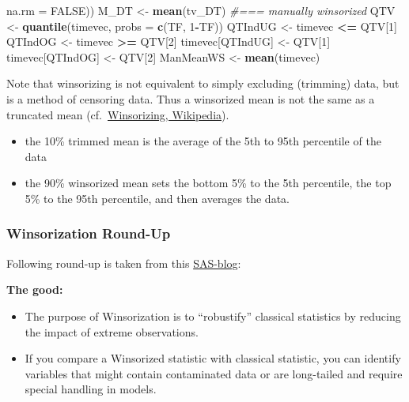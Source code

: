 \documentclass[
]{article}
\newenvironment{Shaded}{\begin{snugshade}}{\end{snugshade}}
\newcommand{\AttributeTok}[1]{\textcolor[rgb]{0.13,0.29,0.53}{#1}}
\newcommand{\CommentTok}[1]{\textcolor[rgb]{0.56,0.35,0.01}{\textit{#1}}}
\newcommand{\ConstantTok}[1]{\textcolor[rgb]{0.56,0.35,0.01}{#1}}
\newcommand{\DecValTok}[1]{\textcolor[rgb]{0.00,0.00,0.81}{#1}}
\newcommand{\FunctionTok}[1]{\textcolor[rgb]{0.13,0.29,0.53}{\textbf{#1}}}
\newcommand{\NormalTok}[1]{#1}
\newcommand{\OtherTok}[1]{\textcolor[rgb]{0.56,0.35,0.01}{#1}}
\newcommand{\SpecialCharTok}[1]{\textcolor[rgb]{0.81,0.36,0.00}{\textbf{#1}}}
\providecommand{\tightlist}{%
  \setlength{\itemsep}{0pt}\setlength{\parskip}{0pt}}
\begin{document}
\begin{Shaded}
\begin{Highlighting}[]
                                    \AttributeTok{na.rm =} \ConstantTok{FALSE}\NormalTok{))}
\NormalTok{  M\_DT      }\OtherTok{\textless{}{-}} \FunctionTok{mean}\NormalTok{(tv\_DT)}
  \CommentTok{\#=== manually winsorized}
\NormalTok{  QTV              }\OtherTok{\textless{}{-}} \FunctionTok{quantile}\NormalTok{(timevec, }\AttributeTok{probs =} \FunctionTok{c}\NormalTok{(TF, }\DecValTok{1}\SpecialCharTok{{-}}\NormalTok{TF))}
\NormalTok{  QTIndUG          }\OtherTok{\textless{}{-}}\NormalTok{ timevec }\SpecialCharTok{\textless{}=}\NormalTok{ QTV[}\DecValTok{1}\NormalTok{]}
\NormalTok{  QTIndOG          }\OtherTok{\textless{}{-}}\NormalTok{ timevec }\SpecialCharTok{\textgreater{}=}\NormalTok{ QTV[}\DecValTok{2}\NormalTok{]}
\NormalTok{  timevec[QTIndUG] }\OtherTok{\textless{}{-}}\NormalTok{ QTV[}\DecValTok{1}\NormalTok{]}
\NormalTok{  timevec[QTIndOG] }\OtherTok{\textless{}{-}}\NormalTok{ QTV[}\DecValTok{2}\NormalTok{]}
\NormalTok{  ManMeanWS        }\OtherTok{\textless{}{-}} \FunctionTok{mean}\NormalTok{(timevec)}
\end{Highlighting}
\end{Shaded}

Note that winsorizing is not equivalent to simply excluding (trimming) data, but is a method of censoring data. Thus a winsorized mean is not the same as a truncated mean (cf.~\href{https://en.wikipedia.org/wiki/Winsorizing}{Winsorizing, Wikipedia}).

\begin{itemize}
\tightlist
\item
  the 10\% trimmed mean is the average of the 5th to 95th percentile of the data
\item
  the 90\% winsorized mean sets the bottom 5\% to the 5th percentile, the top 5\% to the 95th percentile, and then averages the data.
\end{itemize}

\subsubsection*{Winsorization Round-Up}\label{winsorization-round-up}

Following round-up is taken from this \href{https://blogs.sas.com/content/iml/2017/02/08/winsorization-good-bad-and-ugly.html}{SAS-blog}:

\textbf{The good:}

\begin{itemize}
\tightlist
\item
  The purpose of Winsorization is to ``robustify'' classical statistics by reducing the impact of extreme observations.
\item
  If you compare a Winsorized statistic with classical statistic, you can identify variables that might contain contaminated data or are long-tailed and require special handling in models.
\end{itemize}
\end{document}

